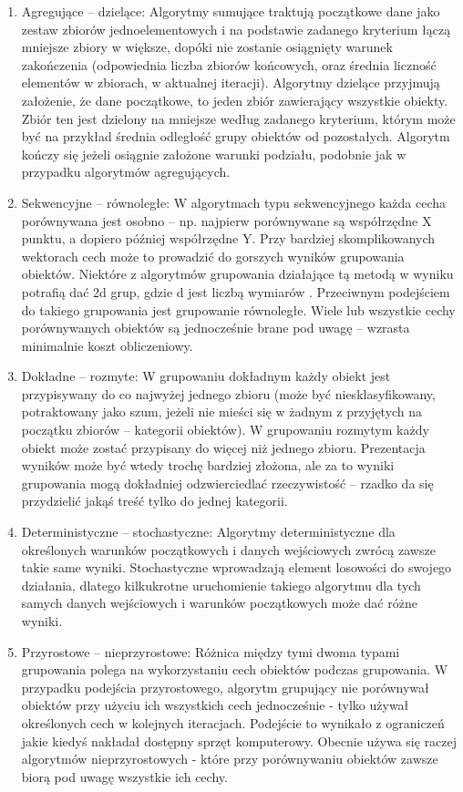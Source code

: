 \documentclass{article}
\begin{document}
\begin{enumerate}
	\item Agregujące – dzielące: Algorytmy sumujące traktują początkowe dane jako zestaw zbiorów jednoelementowych i na podstawie zadanego kryterium łączą mniejsze zbiory w większe, dopóki nie zostanie osiągnięty warunek zakończenia (odpowiednia liczba zbiorów końcowych, oraz średnia liczność elementów w zbiorach, w aktualnej iteracji). Algorytmy dzielące przyjmują założenie, że dane początkowe, to jeden zbiór zawierający wszystkie obiekty. Zbiór ten jest dzielony na mniejsze według zadanego kryterium, którym może być na przykład średnia odległość grupy obiektów od pozostałych. Algorytm kończy się jeżeli osiągnie założone warunki podziału, podobnie jak w przypadku algorytmów agregujących.
	\item Sekwencyjne – równoległe: W algorytmach typu sekwencyjnego każda cecha porównywana jest osobno – np. najpierw porównywane są współrzędne X punktu, a dopiero później współrzędne Y. Przy bardziej skomplikowanych wektorach cech może to prowadzić do gorszych wyników grupowania obiektów. Niektóre z algorytmów grupowania działające tą metodą w wyniku potrafią dać 2d grup, gdzie d jest liczbą wymiarów . Przeciwnym podejściem do takiego grupowania jest grupowanie równoległe. Wiele lub wszystkie cechy porównywanych obiektów są jednocześnie brane pod uwagę – wzrasta minimalnie koszt obliczeniowy.
	\item Dokładne – rozmyte: W grupowaniu dokładnym każdy obiekt jest przypisywany  do co najwyżej jednego zbioru (może być niesklasyfikowany, potraktowany jako szum, jeżeli nie mieści się w żadnym z przyjętych na początku zbiorów – kategorii obiektów). W grupowaniu rozmytym każdy obiekt może zostać przypisany do więcej niż jednego zbioru. Prezentacja wyników może być wtedy trochę bardziej złożona, ale za to wyniki grupowania mogą dokładniej odzwierciedlać rzeczywistość – rzadko da się przydzielić jakąś treść tylko do jednej kategorii.
	\item Deterministyczne – stochastyczne: Algorytmy deterministyczne dla określonych warunków początkowych i danych wejściowych zwrócą zawsze takie same wyniki. Stochastyczne wprowadzają element losowości do swojego działania, dlatego kilkukrotne uruchomienie takiego algorytmu dla tych samych danych wejściowych i warunków początkowych może dać różne wyniki.
	\item Przyrostowe – nieprzyrostowe: Różnica między tymi dwoma typami grupowania polega na wykorzystaniu cech obiektów podczas grupowania. W przypadku podejścia przyrostowego, algorytm grupujący nie porównywał obiektów przy użyciu ich wszystkich cech jednocześnie - tylko używał określonych cech w kolejnych iteracjach. Podejście to wynikało z ograniczeń jakie kiedyś nakładał dostępny sprzęt komputerowy. Obecnie używa się raczej algorytmów nieprzyrostowych - które przy porównywaniu obiektów zawsze biorą pod uwagę wszystkie ich cechy. 
\end{enumerate}
\end{document}
